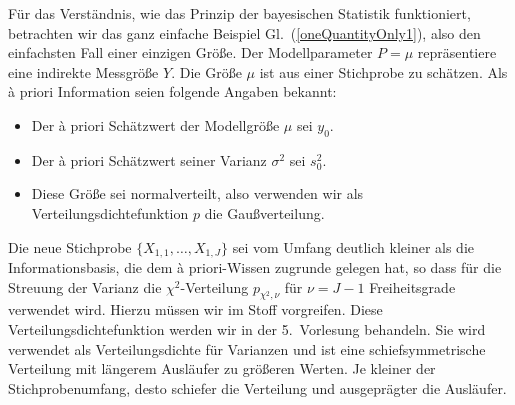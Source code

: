 Für das Verständnis, wie das Prinzip der bayesischen Statistik funktioniert,
betrachten wir das ganz einfache Beispiel Gl.~(\ref{oneQuantityOnly1}), also
 den einfachsten Fall einer einzigen Größe. Der Modellparameter $P = \mu$ repräsentiere
eine indirekte Messgröße $Y$. Die Größe $\mu$ ist aus einer Stichprobe zu schätzen.
Als {\`a} priori Information seien folgende Angaben bekannt:
\begin{itemize}
\item Der {\`a} priori Schätzwert der Modellgröße $\mu$ sei $y_0$.
\item Der {\`a} priori Schätzwert seiner Varianz $\sigma^2$ sei $s^2_0$.
\item Diese Größe sei normalverteilt, also verwenden wir als
Verteilungsdichtefunktion $p$ die Gaußverteilung.
\end{itemize}
Die neue Stichprobe $\{X_{1,1}, \dots, X_{1,J}\}$ sei vom Umfang deutlich kleiner als
die Informationsbasis, die dem {\`a} priori-Wissen zugrunde gelegen hat, so dass
für die Streuung der Varianz die $\chi^2$-Verteilung $p_{\chi^2,\nu}$
für $\nu = J-1$ Freiheitsgrade verwendet wird. Hierzu müssen wir im Stoff vorgreifen.
Diese Verteilungsdichtefunktion werden wir in der 5.\ Vorlesung behandeln.
Sie wird verwendet als Verteilungsdichte für Varianzen und ist eine schiefsymmetrische
Verteilung mit längerem Ausläufer zu größeren Werten. Je kleiner der Stichprobenumfang,
desto schiefer die Verteilung und ausgeprägter die Ausläufer.

